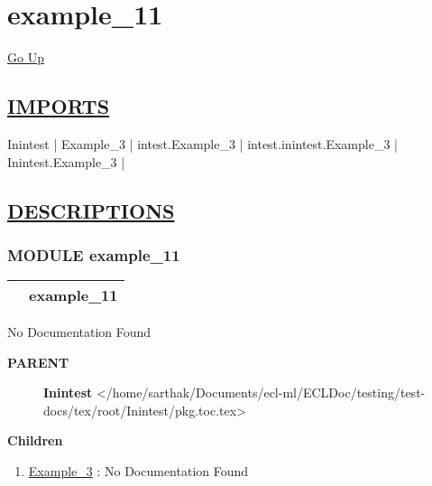 \chapter*{\color{headfile}
example_11
}
\hypertarget{ecldoc:toc:example_11}{}
\hyperlink{ecldoc:toc:root}{Go Up}

\section*{\underline{\textsf{IMPORTS}}}
\begin{doublespace}
{\large
Inintest |
Example\_3 |
intest.Example\_3 |
intest.inintest.Example\_3 |
Inintest.Example\_3 |
}
\end{doublespace}

\section*{\underline{\textsf{DESCRIPTIONS}}}
\subsection*{\textsf{\colorbox{headtoc}{\color{white} MODULE}
example\_11}}

\hypertarget{ecldoc:example_11}{}

{\renewcommand{\arraystretch}{1.5}
\begin{tabularx}{\textwidth}{|>{\raggedright\arraybackslash}l|X|}
\hline
\hspace{0pt}\mytexttt{\color{red} } & \textbf{example\_11} \\
\hline
\end{tabularx}
}

\par





No Documentation Found










\par
\begin{description}
\item [\colorbox{tagtype}{\color{white} \textbf{\textsf{PARENT}}}] \textbf{Inintest} </home/sarthak/Documents/ecl-ml/ECLDoc/testing/test-docs/tex/root/Inintest/pkg.toc.tex>
\end{description}


\textbf{Children}
\begin{enumerate}
\item \hyperlink{ecldoc:Inintest.Example_3}{Example\_3}
: No Documentation Found
\end{enumerate}

